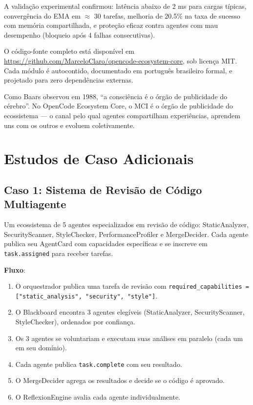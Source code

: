 A validação experimental confirmou: latência abaixo de 2 ms para cargas típicas, convergência do EMA em $\approx$ 30 tarefas, melhoria de 20.5\% na taxa de sucesso com memória compartilhada, e proteção eficaz contra agentes com mau desempenho (bloqueio após 4 falhas consecutivas).

O código-fonte completo está disponível em \url{https://github.com/MarceloClaro/opencode-ecosystem-core}, sob licença MIT. Cada módulo é autocontido, documentado em português brasileiro formal, e projetado para zero dependências externas.

Como Baars observou em 1988, ``a consciência é o órgão de publicidade do cérebro''. No OpenCode Ecosystem Core, o MCI é o órgão de publicidade do ecossistema — o canal pelo qual agentes compartilham experiências, aprendem uns com os outros e evoluem coletivamente.

\section{Estudos de Caso Adicionais}
\label{sec:additional-cases}

\subsection{Caso 1: Sistema de Revisão de Código Multiagente}

Um ecossistema de 5 agentes especializados em revisão de código: StaticAnalyzer, SecurityScanner, StyleChecker, PerformanceProfiler e MergeDecider. Cada agente publica seu AgentCard com capacidades específicas e se inscreve em \texttt{task.assigned} para receber tarefas.

\textbf{Fluxo}:
\begin{enumerate}
    \item O orquestrador publica uma tarefa de revisão com \texttt{required\_capabilities = ["static\_analysis", "security", "style"]}.
    \item O Blackboard encontra 3 agentes elegíveis (StaticAnalyzer, SecurityScanner, StyleChecker), ordenados por confiança.
    \item Os 3 agentes se voluntariam e executam suas análises em paralelo (cada um em seu domínio).
    \item Cada agente publica \texttt{task.complete} com seu resultado.
    \item O MergeDecider agrega os resultados e decide se o código é aprovado.
    \item O ReflexionEngine avalia cada agente individualmente.
\end{enumerate}

